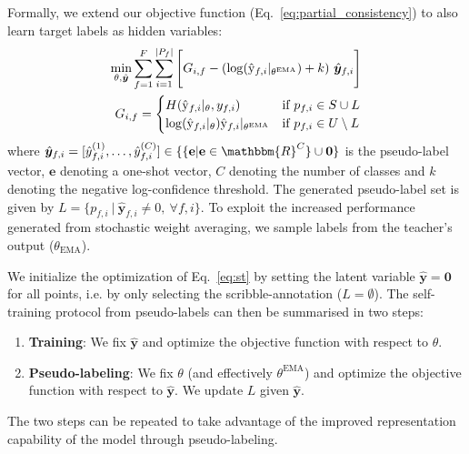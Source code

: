 \documentclass[10pt,twocolumn,letterpaper]{article}
\begin{document}
Formally, we extend our objective function (Eq.~\ref{eq:partial_consistency}) to also learn target labels as hidden variables:
\begin{equation} \label{eq:st}
\begin{split}
        \min_{\theta, \hat{\bm{y}}}
            \sum_{f=1}^{F}\sum_{i=1}^{|P_f|}
                \left[ \vphantom{\sum_{r=1}^R}
                    G_{i,f} - (\log(\hat{\mathrm{y}}_{f,i}|_{\theta^\textrm{EMA}}) +  k) \ \hat{\bm{y}}_{f,i}
                \right] \\
        G_{i,f} =
        \begin{cases}
            H(\hat{\mathrm{y}}_{f,i}|_\theta, y_{f,i})
                & \textrm{if } p_{f,i}\in S \cup L \\
            \log(\hat{\mathrm{y}}_{f,i}|_\theta) \hat{\mathrm{y}}_{f,i}|_{\theta^\textrm{EMA}}
                & \textrm{if } p_{f,i}\in U \setminus L \\
        \end{cases}
\end{split}
\end{equation}
where $\hat{\bm{y}}_{f,i} = [\hat{y}_{f,i}^{(1)}, \dots, \hat{y}_{f,i}^{(C)}] \in \{\{ \mathbf{e} | \mathbf{e} \in \mathbbm{R}^{C} \} \cup \mathbf{0} \}$ is the pseudo-label vector, $\mathbf{e}$ denoting a one-shot vector, $C$ denoting the number of classes and $k$ denoting the negative log-confidence threshold. The generated pseudo-label set is given by ${L = \{p_{f,i} \ | \ \hat{\bm{y}}_{f,i} \neq 0, \ \forall f,i \}}$.
To exploit the increased performance generated from stochastic weight averaging, we sample labels from the teacher's output ($\theta_\textrm{EMA}$).


We initialize the optimization of Eq.~\ref{eq:st} by setting the latent variable $\hat{\bm{y}} = \mathbf{0}$ for all points, i.e. by only selecting the scribble-annotation ($L=\emptyset$). The self-training protocol from pseudo-labels can then be summarised in two steps:
\begin{enumerate}
    \item \textbf{Training}: We fix $\hat{\bm{y}}$ and optimize the objective function with respect to $\theta$.
    \item \textbf{Pseudo-labeling}:  We fix $\theta$ (and effectively $\theta^\textrm{EMA}$) and optimize the objective function with respect to $\hat{\bm{y}}$. We update $L$ given $\hat{\bm{y}}$.
\end{enumerate}
The two steps can be repeated to take advantage of the improved representation capability of the model through pseudo-labeling.
\end{document}

